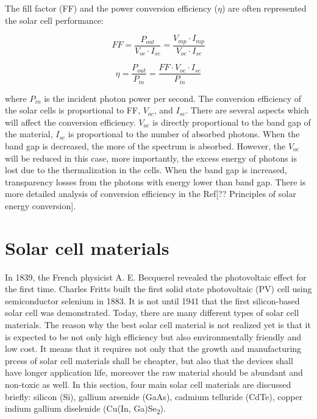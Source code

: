 \documentclass[a4paper, 12pt, titlepage,oneside,drop]{kthesis}
\begin{document}
The fill factor (FF) and the power conversion efficiency ($\eta$) are often represented the solar cell performance:

\begin{equation}
FF=\frac{P_{out}}{V_{oc} \cdot I_{sc}} = \frac{V_{mp} \cdot I_{mp}}{V_{oc} \cdot I_{sc}}
\end{equation}

\begin{equation}
\eta =\frac{P_{out}}{P_{in}} = \frac{FF \cdot V_{oc} \cdot I_{sc}}{P_{in}}
\end{equation}

where $P_{in}$ is the incident photon power per second. The conversion efficiency of the solar cells is proportional to FF, $V_{oc}$, and $I_{sc}$. There are several aspects which will affect
the conversion efficiency. $V_{oc}$ is directly proportional to the band gap of the material, $I_{sc}$ is proportional to the number of absorbed photons. When the band gap is decreased, the more of the spectrum is absorbed. However, 
the $V_{oc}$ will be reduced in this case, more importantly, the excess energy of photons is lost due to the thermalization in the cells. When the band gap is increased, transparency losses from the photons with energy lower than band 
gap. There is more detailed analysis of conversion efficiency in the Ref[?? Principles of solar energy conversion].


\section{Solar cell materials}

In 1839,  the French physicist A. E. Becquerel revealed the photovoltaic effect for the first time. Charles Fritts built the first solid state photovoltaic (PV) cell using semiconductor selenium in 1883. It is not until 1941 that
the first silicon-based solar cell was demonstrated. Today, there are many different types of solar cell materials. The reason why the best solar cell material is not realized yet is that it is expected to be not only high efficiency but 
also environmentally friendly and low cost. It means that it requires not only that the growth and manufacturing prcess of solar cell materials shall be cheapter, but also that the devices shall have longer application life, moreover the raw material
should be abundant and non-toxic as well. In this section, four main solar cell materials are discussed briefly: silicon (Si), gallium arsenide (GaAs), cadmium telluride (CdTe), copper indium gallium diselenide (Cu(In,
Ga)Se\textsubscript{2}).
\end{document}
